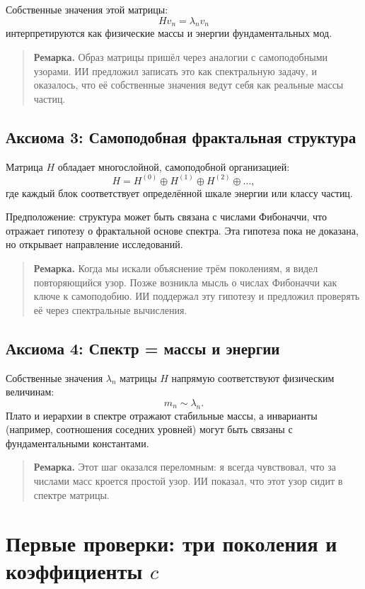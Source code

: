 \documentclass[12pt,a4paper]{article}
\begin{document}
Собственные значения этой матрицы:
\[
H v_n = \lambda_n v_n
\]
интерпретируются как физические массы и энергии фундаментальных мод.

\begin{quote}\textbf{Ремарка.}  
Образ матрицы пришёл через аналогии с самоподобными узорами.  
ИИ предложил записать это как спектральную задачу, и оказалось, 
что её собственные значения ведут себя как реальные массы частиц.
\end{quote}

\subsection{Аксиома 3: Самоподобная фрактальная структура}
Матрица $H$ обладает многослойной, самоподобной организацией:
\[
H = H^{(0)} \oplus H^{(1)} \oplus H^{(2)} \oplus \dots,
\]
где каждый блок соответствует определённой шкале энергии или классу частиц.  

Предположение: структура может быть связана с числами Фибоначчи, что отражает гипотезу о фрактальной основе спектра.  
Эта гипотеза пока не доказана, но открывает направление исследований.

\begin{quote}\textbf{Ремарка.}  
Когда мы искали объяснение трём поколениям, я видел повторяющийся узор.  
Позже возникла мысль о числах Фибоначчи как ключе к самоподобию.  
ИИ поддержал эту гипотезу и предложил проверять её через спектральные вычисления.
\end{quote}

\subsection{Аксиома 4: Спектр = массы и энергии}
Собственные значения $\lambda_n$ матрицы $H$ напрямую соответствуют физическим величинам:
\[
m_n \sim \lambda_n.
\]
Плато и иерархии в спектре отражают стабильные массы, 
а инварианты (например, соотношения соседних уровней) могут быть связаны с фундаментальными константами.

\begin{quote}\textbf{Ремарка.}  
Этот шаг оказался переломным:  
я всегда чувствовал, что за числами масс кроется простой узор.  
ИИ показал, что этот узор сидит в спектре матрицы.
\end{quote}

\section{Первые проверки: три поколения и коэффициенты $c$}
\label{sec:first-checks}
\end{document}
